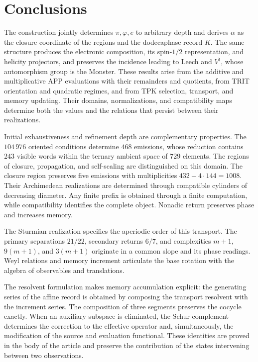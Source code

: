 \section{Conclusions}
\label{sec:conclusiones}

The construction jointly determines \(\pi,\varphi,e\) to arbitrary
depth and derives \(\alpha\) as the closure coordinate of the regions
and the dodecaphase record \(K\). The same structure produces the
electronic composition, its spin-\(1/2\) representation, and helicity
projectors, and preserves the incidence leading to Leech and
\(V^\natural\), whose automorphism group is the Monster.
These results arise from the additive and multiplicative APP evaluations
with their remainders and quotients, from TRIT orientation and quadratic
regimes, and from TPK selection, transport, and memory updating.
Their domains, normalizations, and compatibility maps determine both the
values and the relations that persist between their realizations.

Initial exhaustiveness and refinement depth are complementary properties. The \(104\,976\) oriented conditions determine \(468\) emissions, whose reduction contains \(243\) visible words within the ternary ambient space of \(729\) elements. The regions of closure, propagation, and self-scaling are distinguished on this domain. The closure region preserves five emissions with multiplicities \(432+4\cdot144=1008\). Their Archimedean realizations are determined through compatible cylinders of decreasing diameter. Any finite prefix is obtained through a finite computation, while compatibility identifies the complete object. Nonadic return preserves phase and increases memory.

The Sturmian realization specifies the aperiodic order of this transport. The primary separations \(21/22\), secondary returns \(6/7\), and complexities \(m+1\), \(9(m+1)\), and \(3(m+1)\) originate in a common slope and its phase readings. Weyl relations and memory increment articulate the base rotation with the algebra of observables and translations.

The resolvent formulation makes memory accumulation explicit: the generating series of the affine record is obtained by composing the transport resolvent with the increment series. The composition of three segments preserves the cocycle exactly. When an auxiliary subspace is eliminated, the Schur complement determines the correction to the effective operator and, simultaneously, the modification of the source and evaluation functional. These identities are proved in the body of the article and preserve the contribution of the states intervening between two observations.

